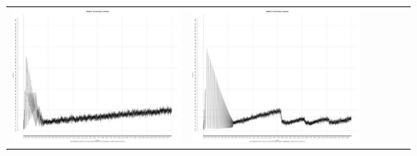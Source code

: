 \begin{table}[htbp]
{\begin{tabular}{l | ccccc}
\begin{minipage}{.15\textwidth}
     			 	\includegraphics[width=\linewidth]{images/mema-graph/I8}
    				 \end{minipage}
    			   &	 \begin{minipage}{.15\textwidth}
     			 	\includegraphics[width=\linewidth]{images/mema-graph/I11}
    				 \end{minipage}
    			   &	 \begin{minipage}{.15\textwidth}

\end{minipage}
\end{tabular}}
\end{table}

